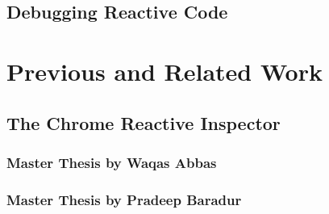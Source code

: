 	\subsection{Debugging Reactive Code}
	


\section{Previous and Related Work}
	\subsection{The Chrome Reactive Inspector}		
		\subsubsection{Master Thesis by Waqas Abbas}
		
		\subsubsection{Master Thesis by Pradeep Baradur}
		
